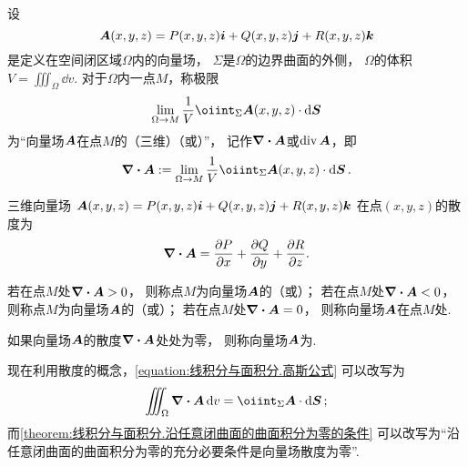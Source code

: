 \begin{definition}[空间中的散度]
\def\defofdiv{\lim_{\Omega \to M} \frac{1}{V} \oiint_\Sigma \vb{A}(x,y,z) \cdot \dd{\vb{S}}}%
设\[
	\boldsymbol{A}(x,y,z)=P(x,y,z)\boldsymbol{i}+Q(x,y,z)\boldsymbol{j}+R(x,y,z)\boldsymbol{k}
\]是定义在空间闭区域\(\Omega\)内的向量场，
\(\Sigma\)是\(\Omega\)的边界曲面的外侧，
\(\Omega\)的体积\(V = \iiint_\Omega \dd{v}\).
对于\(\Omega\)内一点\(M\)，称极限\[
	\defofdiv
\]为“向量场\(\boldsymbol{A}\)在点\(M\)的（三维）（或）”，
记作\(\div{\boldsymbol{A}}\)或\(\operatorname{div}\boldsymbol{A}\)，即\[
	\div{\vb{A}} \defeq \defofdiv.
\]
\end{definition}

\begin{proposition}
三维向量场
\(\boldsymbol{A}(x,y,z)=P(x,y,z)\boldsymbol{i}+Q(x,y,z)\boldsymbol{j}+R(x,y,z)\boldsymbol{k}\)
在点\((x,y,z)\)的散度为\[
	\div{\boldsymbol{A}}
	= \pdv{P}{x}+\pdv{Q}{y}+\pdv{R}{z}.
\]
\end{proposition}

\begin{definition}
若在点\(M\)处\(\div{\boldsymbol{A}}>0\)，
则称点\(M\)为向量场\(\boldsymbol{A}\)的（或）；
若在点\(M\)处\(\div{\boldsymbol{A}}<0\)，
则称点\(M\)为向量场\(\boldsymbol{A}\)的（或）；
若在点\(M\)处\(\div{\boldsymbol{A}}=0\)，
则称向量场\(\boldsymbol{A}\)在点\(M\)处.

如果向量场\(\boldsymbol{A}\)的散度\(\div{\boldsymbol{A}}\)处处为零，
则称向量场\(\boldsymbol{A}\)为.
\end{definition}

现在利用散度的概念，\cref{equation:线积分与面积分.高斯公式} 可以改写为
\begin{equation}\label{equation:线积分与面积分.高斯公式1}
	\iiint_\Omega \div{\vb{A}} \dd{v}
	= \oiint_\Sigma \vb{A} \cdot \dd{\vb{S}};
\end{equation}
而\cref{theorem:线积分与面积分.沿任意闭曲面的曲面积分为零的条件}
可以改写为“沿任意闭曲面的曲面积分为零的充分必要条件是向量场散度为零”.

